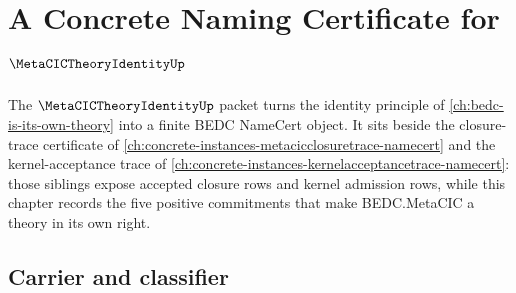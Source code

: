 \chapter{A Concrete Naming Certificate for $\MetaCICTheoryIdentityUp$}
\label{ch:concrete-instances-metacic-theory-identity-namecert}

The $\MetaCICTheoryIdentityUp$ packet turns the identity principle of \autoref{ch:bedc-is-its-own-theory} into a finite BEDC NameCert object. It sits beside the closure-trace certificate of \autoref{ch:concrete-instances-metacicclosuretrace-namecert} and the kernel-acceptance trace of \autoref{ch:concrete-instances-kernelacceptancetrace-namecert}: those siblings expose accepted closure rows and kernel admission rows, while this chapter records the five positive commitments that make BEDC.MetaCIC a theory in its own right.

\section{Carrier and classifier}
\label{sec:metacic-theory-identity-carrier}


